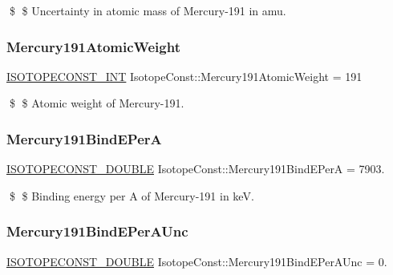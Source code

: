 \$ \$ Uncertainty in atomic mass of Mercury-\/191 in amu. \mbox{\label{group___isotope_const-_mercury-_hg191_ga1c01a60e9bb8a300273bdc390f18adee}} 
\subsubsection{\texorpdfstring{Mercury191\+Atomic\+Weight}{Mercury191AtomicWeight}}
{\footnotesize\ttfamily \mbox{\hyperlink{group___isotope_const-_macros_ga5f18360b3e99483a35c32d789e62621c}{I\+S\+O\+T\+O\+P\+E\+C\+O\+N\+S\+T\+\_\+\+I\+NT}} Isotope\+Const\+::\+Mercury191\+Atomic\+Weight = 191}

\$ \$ Atomic weight of Mercury-\/191. \mbox{\label{group___isotope_const-_mercury-_hg191_gae16cc801f8aac1e0196dbceb36d3f82d}} 
\subsubsection{\texorpdfstring{Mercury191\+Bind\+E\+PerA}{Mercury191BindEPerA}}
{\footnotesize\ttfamily \mbox{\hyperlink{group___isotope_const-_macros_ga8f45a7272ce02c0b4c65c44636ed719a}{I\+S\+O\+T\+O\+P\+E\+C\+O\+N\+S\+T\+\_\+\+D\+O\+U\+B\+LE}} Isotope\+Const\+::\+Mercury191\+Bind\+E\+PerA = 7903.}

\$ \$ Binding energy per A of Mercury-\/191 in keV. \mbox{\label{group___isotope_const-_mercury-_hg191_ga6183e0e46d57bf45980c8dca3f7c1833}} 
\subsubsection{\texorpdfstring{Mercury191\+Bind\+E\+Per\+A\+Unc}{Mercury191BindEPerAUnc}}
{\footnotesize\ttfamily \mbox{\hyperlink{group___isotope_const-_macros_ga8f45a7272ce02c0b4c65c44636ed719a}{I\+S\+O\+T\+O\+P\+E\+C\+O\+N\+S\+T\+\_\+\+D\+O\+U\+B\+LE}} Isotope\+Const\+::\+Mercury191\+Bind\+E\+Per\+A\+Unc = 0.}

